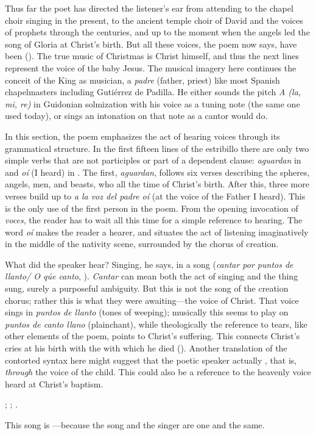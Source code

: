 Thus far the poet has directed the listener's ear from attending to the chapel
choir singing in the present, to the ancient temple choir of David and the
voices of prophets through the centuries, and up to the moment when the angels
led the song of Gloria at Christ's birth.
But all these voices, the poem now says, have been  ().
The true music of Christmas is Christ himself, and thus the next lines represent
the voice of the baby Jesus.
The musical imagery here continues the conceit of the King as musician, a
\emph{padre} (father, priest) like most Spanish chapelmasters including
Gutiérrez de Padilla.
He either sounds the pitch \emph{A (la, mi, re)} in Guidonian solmization with
his voice as a tuning note (the same one used today), or sings an intonation on
that note as a cantor would do.

In this section, the poem emphasizes the act of hearing voices through its
grammatical structure.
In the first fifteen lines of the estribillo there are only two simple verbs
that are not participles or part of a dependent clause: \emph{aguardan} in
 and \emph{oí} (I heard) in .
The first, \emph{aguardan}, follows six verses describing the spheres, angels,
men, and beasts, who all  the time of Christ's birth.
After this, three more verses build up to \emph{a la voz del padre oí} (at the
voice of the Father I heard).
This is the only use of the first person in the poem.
From the opening invocation of \emph{voces}, the reader has to wait all this
time for a simple reference to hearing.
The word \emph{oí} makes the reader a hearer, and situates the act of listening
imaginatively in the middle of the nativity scene, surrounded by the chorus of
creation.

What did the speaker hear? 
Singing, he says, in a song (\emph{cantar por puntos de llanto/ O qúe canto},
).
\emph{Cantar} can mean both the act of singing and the thing sung, surely a
purposeful ambiguity.
But this is not the song of the creation chorus; rather this is what they were
awaiting---the voice of Christ.
That voice sings in \emph{puntos de llanto} (tones of weeping); musically this
seems to play on \emph{puntos de canto llano} (plainchant), while theologically
the reference to tears, like other elements of the poem, points to Christ's
suffering.
This connects Christ's cries at his birth with the  with
which he died ().
Another translation of the contorted syntax here might suggest that the poetic
speaker actually , that is,
\emph{through} the voice of the child.
This could also be a reference to the heavenly voice heard at Christ's baptism.%
\begin{Footnote} 
    ; ; .
\end{Footnote}
This song is ---because
the song and the singer are one and the same.


